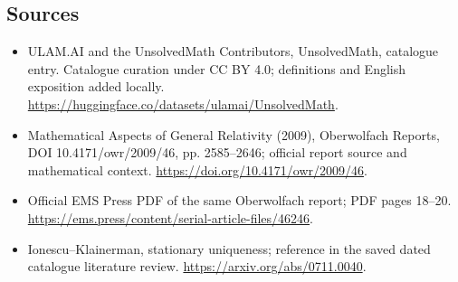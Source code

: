 \documentclass[11pt]{article}
\begin{document}
\subsection{Sources}
\begin{itemize}
\item[\hypertarget{source:statement:1}{S1}] ULAM.AI and the UnsolvedMath Contributors, UnsolvedMath, catalogue entry. Catalogue curation under CC BY 4.0; definitions and English exposition added locally.
\url{https://huggingface.co/datasets/ulamai/UnsolvedMath}.
\item[\hypertarget{source:statement:2}{S2}] Mathematical Aspects of General Relativity (2009), Oberwolfach Reports, DOI 10.4171/owr/2009/46, pp. 2585--2646; official report source and mathematical context.
\url{https://doi.org/10.4171/owr/2009/46}.
\item[\hypertarget{source:statement:3}{S3}] Official EMS Press PDF of the same Oberwolfach report; PDF pages 18--20.
\url{https://ems.press/content/serial-article-files/46246}.
\item[\hypertarget{source:statement:4}{S4}] Ionescu--Klainerman, stationary uniqueness; reference in the saved dated catalogue literature review.
\url{https://arxiv.org/abs/0711.0040}.
\end{itemize}
\label{end:statement}
\end{document}
